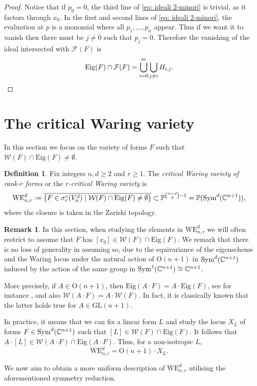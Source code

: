 \documentclass{amsart}
\numberwithin{theorem}{section}
\theoremstyle{definition}
\newtheorem{definition}[theorem]{Definition}
\newtheorem{remark}[theorem]{Remark}
\newcommand{\Eig}{\mathrm{Eig}}
\newcommand{\PP}{\mathbb{P}}
\newcommand{\CC}{\mathbb{C}}
\newcommand{\sym}{\mathop{\rm Sym}\nolimits}
\begin{document}
\begin{proof}
{Notice that if $p_0 = 0$, the third line of \cref{eq: ideali 2-minori} is trivial, as it factors through $x_0$. In the first and second lines of \cref{eq: ideali 2-minori}, the evaluation at $p$ is a monomial where all $p_1,\ldots,p_n$ appear. 
Thus if we want it to vanish then there must be $j\ne0$ such that $p_j=0$. Therefore the vanishing of the ideal intersected with $\mathcal F(F)$ is
\begin{equation*}
\Eig(F)\cap\mathcal F(F)=\bigcup_{i=0}^{m} \bigcup_{j\neq i} H_{i,j}. \qedhere
\end{equation*}
}\end{proof}



\section{The critical Waring variety}\label{section: critical W locus}

In this section we focus on the variety of forms $F$ such that $\mathcal W(F)\cap \mathrm
{Eig}(F)\neq \emptyset$.

\begin{definition}\label{def: critical waring locus}
    Fix integers $n,d\geq 2$ {and $r \geq 1$}. The \emph{critical Waring variety of rank-$r$ forms} or the \emph{$r$-critical Waring variety} is
    \[
        \mathrm{WE}_{n,r}^d:=\overline{\{F\in \sigma_r^\circ(V_n^d)\mid \mathcal W(F)\cap \mathrm{Eig}(F)\neq \emptyset\}}\subset \PP^{\binom{n+d}{d}-1}=\PP(\sym^d(\CC^{n+1})),
    \]
    where the closure is taken in the Zariski topology.

\end{definition}



\begin{remark}\label{rmk: invariance}
In this section, when studying the elements in $\mathrm{WE}_{n,r}^d$ we will often restrict to assume that $F$ has $[x_0]\in \mathcal W(F)\cap \mathrm{Eig}(F)$. We remark that there is no loss of generality in assuming so, due to the equivariance of the eigenscheme and the Waring locus under the natural action of $\mathrm{O}(n+1)$ in $\sym^{d}(\CC^{n+1})$ induced by the action of the same group in $\sym^1(\CC^{n+1})\cong \CC^{n+1}$. 

More precisely, if $A\in \mathrm O(n+1)$, then $\Eig(A\cdot F)=A\cdot \Eig(F)$, see for instance \cite{Ott22}, and also $\mathcal W(A\cdot F)=A\cdot \mathcal W(F)$. In fact, it is classically known that the latter holds true for $A\in \mathrm{GL}(n+1)$. 

In practice, it means that we can fix a linear form $L$ and study the locus $X_L$ of forms $F\in \sym^d(\CC^{n+1})$ such that $[L]\in \mathcal W(F)\cap\mathrm{Eig}(F)$. It follows that $A\cdot [L]\in \mathcal W(A\cdot F)\cap\mathrm{Eig}(A\cdot F)$. Thus, for a non-isotropic $L$, 
$$
\mathrm{WE}_{n,r}^d=\overline{ \mathrm{O}(n+1)\cdot X_L}. 
$$

   
\end{remark}
We now aim to obtain a more uniform description of $\mathrm{WE}_{n,r}^d$ utilising the aforementioned symmetry reduction. 
\end{document}
